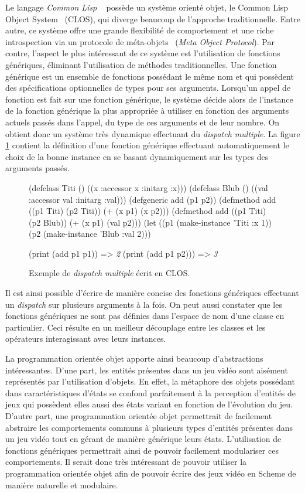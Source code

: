\documentclass[12pt,oneside,letterpaper,francais]{book}
\newcommand{\clisp}{{\textit{Common Lisp }}}
\newcommand{\schemeresult}[1]{{\it #1}}
\begin{document}
Le langage \clisp~\cite{CLISP} possède un système orienté objet, le
Common Lisp Object System~\cite{CLOS} (CLOS), qui diverge beaucoup de
l'approche traditionnelle. Entre autre, ce système offre une grande
flexibilité de comportement et une riche introspection via un
protocole de méta-objets~\cite{MOP} (\textit{Meta Object
  Protocol}). Par contre, l'aspect le plus intéressant de ce système
est l'utilisation de fonctions génériques, éliminant l'utilisation de
méthodes traditionnelles. Une fonction générique est un ensemble de
fonctions possédant le même nom et qui possèdent des spécifications
optionnelles de types pour ses arguments. Lorsqu'un appel de fonction
est fait sur une fonction générique, le système décide alors de
l'instance de la fonction générique la plus appropriée à utiliser en
fonction des arguments actuels passés dans l'appel, du type de ces
arguments et de leur nombre. On obtient donc un système très dynamique
effectuant du \textit{dispatch multiple}. La figure \ref{OO:CLOS_ex}
contient la définition d'une fonction générique effectuant
automatiquement le choix de la bonne instance en se basant
dynamiquement sur les types des arguments passés.

\begin{figure}[htb!]
  \begin{schemecode}
(defclass Titi () ((x :accessor x :initarg :x)))
(defclass Blub () ((val :accessor val :initarg :val)))
(defgeneric add (p1 p2))
(defmethod add ((p1 Titi) (p2 Titi)) (+ (x p1) (x p2)))
(defmethod add ((p1 Titi) (p2 Blub)) (+ (x p1) (val p2)))
(let ((p1 (make-instance 'Titi :x 1))
      (p2 (make-instance 'Blub :val 2)))

  (print (add p1 p1))  => \schemeresult{2}
  (print (add p1 p2))) => \schemeresult{3}
  \end{schemecode}
  \caption{Exemple de \textit{dispatch multiple} écrit en CLOS.}
  \label{OO:CLOS_ex}
\end{figure}

Il est ainsi possible d'écrire de manière concise des fonctions
génériques effectuant un \textit{dispatch} sur plusieurs arguments à
la fois. On peut aussi constater que les fonctions génériques ne sont
pas définies dans l'espace de nom d'une classe en particulier. Ceci
résulte en un meilleur découplage entre les classes et les opérateurs
interagissant avec leurs instances.

La programmation orientée objet apporte ainsi beaucoup d'abstractions
intéressantes. D'une part, les entités présentes dans un jeu vidéo
sont aisément représentés par l'utilisation d'objets. En effet, la
métaphore des objets possédant dans caractéristiques d'états se
confond parfaitement à la perception d'entités de jeux qui possèdent
elles aussi des états variant en fonction de l'évolution du
jeu. D'autre part, une programmation orientée objet permettrait de
facilement abstraire les comportements communs à plusieurs types
d'entités présentes dans un jeu vidéo tout en gérant de manière
générique leurs états.  L'utilisation de fonctions génériques
permettrait ainsi de pouvoir facilement modulariser ces
comportements. Il serait donc très intéressant de pouvoir utiliser la
programmation orientée objet afin de pouvoir écrire des jeux vidéo en
Scheme de manière naturelle et modulaire.
\end{document}
